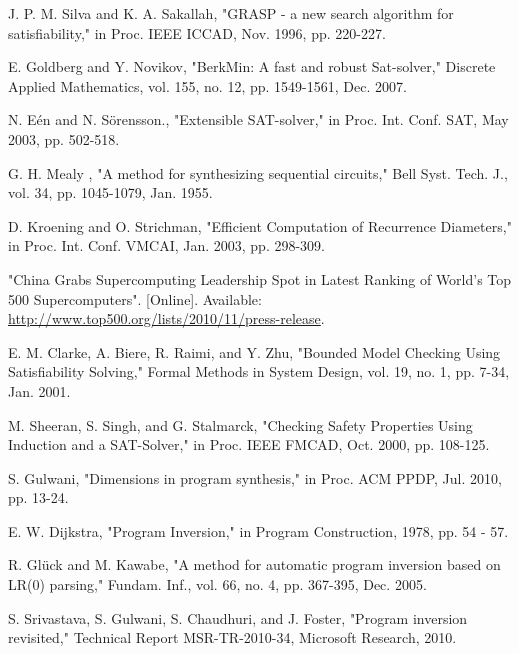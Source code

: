 \documentclass[journal]{IEEEtran}
\begin{document}
\begin{thebibliography}{1}
J. P. M. Silva and K. A. Sakallah,
"GRASP - a new search algorithm for satisfiability,"
in Proc. IEEE ICCAD, Nov. 1996, pp. 220-227.


E. Goldberg and Y. Novikov,
"BerkMin: A fast and robust Sat-solver,"
Discrete Applied Mathematics,
vol. 155, no. 12,
pp. 1549-1561, Dec. 2007.

N. E\'en and N. S\"orensson.,
"Extensible SAT-solver,"
in Proc. Int. Conf.
SAT, May 2003, pp. 502-518.

G. H. Mealy , "A method for synthesizing sequential circuits," Bell Syst.
Tech. J., vol. 34, pp. 1045-1079, Jan. 1955.


D. Kroening and O. Strichman,
"Efficient Computation of Recurrence Diameters,"
in Proc. Int. Conf. VMCAI, Jan. 2003,
pp. 298-309.



"China Grabs Supercomputing Leadership Spot in Latest Ranking of World's Top 500 Supercomputers". [Online]. Available: \url{http://www.top500.org/lists/2010/11/press-release}.





E. M. Clarke, A. Biere, R. Raimi, and Y. Zhu,
"Bounded Model Checking Using Satisfiability Solving,"
Formal Methods in System Design,
vol. 19, no. 1,
pp. 7-34, Jan. 2001.



M. Sheeran, S. Singh, and G. Stalmarck,
"Checking Safety Properties Using Induction and a SAT-Solver,"
in Proc. IEEE FMCAD, Oct. 2000, pp. 108-125.





S. Gulwani,
"Dimensions in program synthesis,"
in Proc. ACM PPDP, Jul. 2010, pp. 13-24.



E. W. Dijkstra,
"Program Inversion,"
in Program Construction,
1978,
pp. 54 - 57.


R. Gl\"{u}ck and M. Kawabe,
"A method for automatic program inversion based on LR(0) parsing,"
Fundam. Inf.,
vol. 66, no. 4,
pp. 367-395, Dec. 2005.


S. Srivastava,
S. Gulwani,
S. Chaudhuri, and
J. Foster,
"Program inversion revisited,"
Technical Report MSR-TR-2010-34, Microsoft Research, 2010.



\end{thebibliography}
\end{document}
